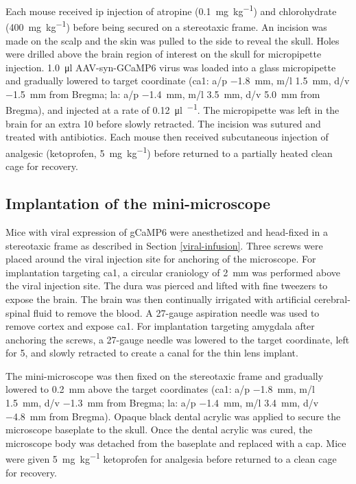 Each mouse received \gls{ip} injection of atropine (\SI{0.1}{\mg\per\kg}) and chlorohydrate (\SI{400}{\mg\per\kg}) before being secured on a stereotaxic frame. An incision was made on the scalp and the skin was pulled to the side to reveal the skull. Holes were drilled above the brain region of interest on the skull for micropipette injection. \SI{1.0}{\ul} AAV-syn-GCaMP6 virus was loaded into a glass micropipette and gradually lowered to target coordinate (\gls{ca1}: \gls{a/p} \SI{-1.8}{\mm}, \gls{m/l} \SI{1.5}{\mm}, \gls{d/v} \SI{-1.5}{\mm} from Bregma; \gls{la}: \gls{a/p} \SI{-1.4}{\mm}, \gls{m/l} \SI{3.5}{\mm}, \gls{d/v} \SI{5.0}{\mm} from Bregma), and injected at a rate of \SI{0.12}{\ul\per\min}. The micropipette was left in the brain for an extra \SI{10}{\min} before slowly retracted. The incision was sutured and treated with antibiotics. Each mouse then received subcutaneous injection of analgesic (ketoprofen, \SI{5}{\mg\per\kg}) before returned to a partially heated clean cage for recovery.

\subsection{Implantation of the mini-microscope}

Mice with viral expression of gCaMP6 were anesthetized and head-fixed in a stereotaxic frame as described in Section \ref{viral-infusion}. Three screws were placed around the viral injection site for anchoring of the microscope. For implantation targeting \gls{ca1}, a circular craniology of \SI{2}{\mm} was performed above the viral injection site. The dura was pierced and lifted with fine tweezers to expose the brain. The brain was then continually irrigated with artificial cerebral-spinal fluid to remove the blood. A 27-gauge aspiration needle was used to remove cortex and expose \gls{ca1}. For implantation targeting amygdala after anchoring the screws, a 27-gauge needle was lowered to the target coordinate, left for \SI{5}{\min}, and slowly retracted to create a canal for the thin lens implant.

The mini-microscope was then fixed on the stereotaxic frame and gradually lowered to \SI{0.2}{\mm} above the target coordinates (\gls{ca1}: \gls{a/p} \SI{-1.8}{\mm}, \gls{m/l} \SI{1.5}{\mm}, \gls{d/v} \SI{-1.3}{\mm} from Bregma; \gls{la}: \gls{a/p} \SI{-1.4}{\mm}, \gls{m/l} \SI{3.4}{\mm}, \gls{d/v} \SI{-4.8}{\mm} from Bregma). Opaque black dental acrylic was applied to secure the microscope baseplate to the skull. Once the dental acrylic was cured, the microscope body was detached from the baseplate and replaced with a cap. Mice were given \SI{5}{\mg\per\kg} ketoprofen for analgesia before returned to a clean cage for recovery.

